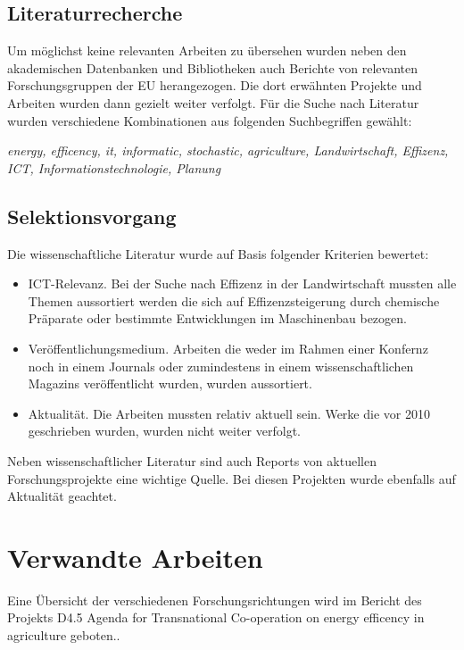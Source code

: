 \subsection{Literaturrecherche}
Um möglichst keine relevanten Arbeiten zu übersehen wurden neben den akademischen Datenbanken und Bibliotheken auch Berichte von relevanten Forschungsgruppen der EU herangezogen. Die dort erwähnten Projekte und Arbeiten wurden dann gezielt weiter verfolgt. Für die Suche nach Literatur wurden verschiedene Kombinationen aus folgenden Suchbegriffen gewählt:

\textit{energy, efficency, it, informatic, stochastic, agriculture, Landwirtschaft, Effizenz, ICT, Informationstechnologie, Planung}

\subsection{Selektionsvorgang}
Die wissenschaftliche Literatur wurde auf Basis folgender Kriterien bewertet:
\begin{itemize}
  \item ICT-Relevanz. Bei der Suche nach Effizenz in der Landwirtschaft mussten alle Themen aussortiert werden die sich auf Effizenzsteigerung durch chemische Präparate oder bestimmte Entwicklungen im Maschinenbau bezogen.
  \item Veröffentlichungsmedium. Arbeiten die weder im Rahmen einer Konfernz noch in einem Journals oder zumindestens in einem wissenschaftlichen Magazins veröffentlicht wurden, wurden aussortiert.
  \item Aktualität. Die Arbeiten mussten relativ aktuell sein. Werke die vor 2010 geschrieben wurden, wurden nicht weiter verfolgt.
\end{itemize}

Neben wissenschaftlicher Literatur sind auch Reports von aktuellen Forschungsprojekte eine wichtige Quelle. Bei diesen Projekten wurde ebenfalls auf Aktualität geachtet.

\section{Verwandte Arbeiten}
Eine Übersicht der verschiedenen Forschungsrichtungen wird im Bericht des Projekts D4.5 Agenda for Transnational Co-operation on energy efficency in agriculture geboten.\cite{misc:Mikkola2013}.
